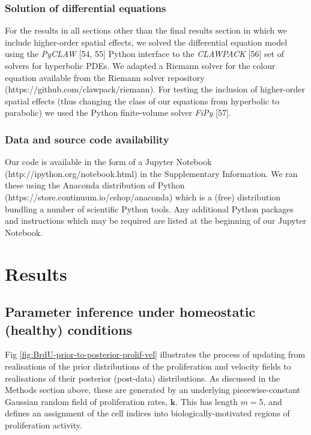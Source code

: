 \documentclass[10pt,letterpaper]{article}
\begin{document}
\subsubsection{Solution of differential equations}\label{differential-equations}

For the results in all sections other than the final results section in
which we include higher-order spatial effects, we solved the
differential equation model using the \emph{PyCLAW} {[}54, 55{]} Python
interface to the \emph{CLAWPACK} {[}56{]} set of solvers for hyperbolic
PDEs. We adapted a Riemann solver for the colour equation available from
the Riemann solver repository (https://github.com/clawpack/riemann). For
testing the inclusion of higher-order spatial effects (thus changing the
class of our equations from hyperbolic to parabolic) we used the Python
finite-volume solver \emph{FiPy} {[}57{]}.

\subsubsection{Data and source code
availability}\label{data-and-source-code-availability}

Our code is available in the form of a Jupyter Notebook
(http://ipython.org/notebook.html) in the Supplementary Information. We
ran these using the Anaconda distribution of Python
(https://store.continuum.io/cshop/anaconda) which is a (free)
distribution bundling a number of scientific Python tools. Any
additional Python packages and instructions which may be required are
listed at the beginning of our Jupyter Notebook.

\section{Results}\label{results}

\subsection{Parameter inference under homeostatic (healthy)
conditions}\label{parameter-inference-under-homeostatic-healthy-conditions}

Fig \ref{fig:BrdU-prior-to-posterior-prolif-vel} illustrates the process
of updating from realisations of the prior distributions of the
proliferation and velocity fields to realisations of their posterior
(post-data) distributions. As discussed in the Methods section above,
these are generated by an underlying piecewise-constant Gaussian random
field of proliferation rates, \(\mathbf{k}\). This has length \(m=5\),
and defines an assignment of the cell indices into
biologically-motivated regions of proliferation activity.
\end{document}
